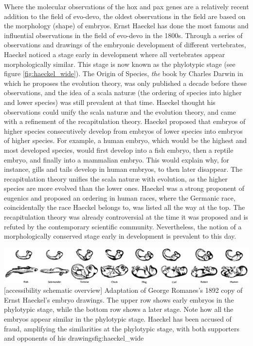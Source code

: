 Where the molecular observations of the hox and pax genes are a relatively recent addition to the field of evo-devo, the oldest observations in the field are based on the morphology (shape) of embryos. Ernst Haeckel has done the most famous and influential observations in the field of evo-devo in the 1800s\cite{haeckel1866}. Through a series of observations and drawings of the embryonic development of different vertebrates, Haeckel noticed a stage early in development where all vertebrates appear morphologically similar. This stage is now known as the phylotypic stage (see figure \ref{fig:haeckel_wide}). The Origin of Species, \textit{the} book by Charles Darwin in which he proposes the evolution theory, was only published a decade before these observations, and the idea of a scala naturæ (the ordering of species into higher and lower species) was still prevalent at that time. Haeckel thought his observations could unify the scala naturæ and the evolution theory, and came with a refinement of the recapitulation theory. Haeckel proposed that embryos of higher species consecutively develop from embryos of lower species into embryos of higher species. For example, a human embryo, which would be the highest and most developed species, would first develop into a fish embryo, then a reptile embryo, and finally into a mammalian embryo. This would explain why, for instance, gills and tails develop in human embryos, to then later disappear. The recapitulation theory unifies the scala naturæ with evolution, as the higher species are more evolved than the lower ones. Haeckel was a strong proponent of eugenics and proposed an ordering in human races, where the Germanic race, coincidentally the race Haeckel belongs to, was listed all the way at the top\cite{Levit2020}. The recapitulation theory was already controversial at the time it was proposed and is refuted by the contemporary scientific community. Nevertheless, the notion of a morphologically conserved stage early in development is prevalent to this day.

{\includegraphics[width=2.2\textwidth]
{ch.introduction/imgs/haeckel_wide.png}}
[accessibility schematic overview]
{Adaptation of George Romanes's 1892 copy of Ernst Haeckel's embryo drawings. The upper row shows early embryos in the phylotypic stage, while the bottom row shows a later stage. Note how all the embryos appear similar in the phylotypic stage. Haeckel has been accused of fraud, amplifying the similarities at the phylotypic stage, with both supporters\cite{Richards2008} and opponents of his drawings\cite{Pennisi1997}}{fig:haeckel_wide}

